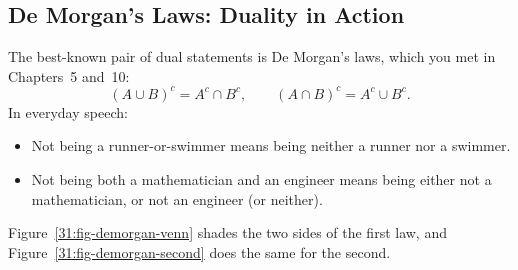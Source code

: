 \subsection{De Morgan's Laws: Duality in Action}

The best-known pair of dual statements is De Morgan's laws, which you met in Chapters~5 and~10:
\[
(A \cup B)^c = A^c \cap B^c, \qquad (A \cap B)^c = A^c \cup B^c.
\]
In everyday speech:
\begin{itemize}
  \item Not being a runner-or-swimmer means being neither a runner nor a swimmer.
  \item Not being both a mathematician and an engineer means being either not a mathematician, or not an engineer (or neither).
\end{itemize}

Figure~\ref{31:fig-demorgan-venn} shades the two sides of the first law, and Figure~\ref{31:fig-demorgan-second} does the same for the second.

